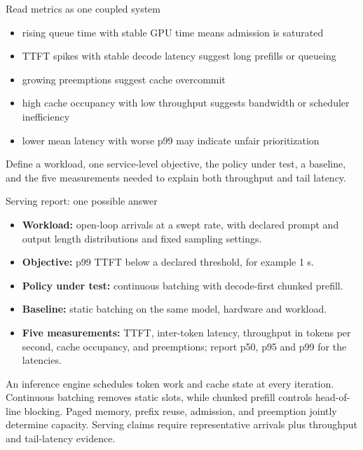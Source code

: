 \documentclass[handout]{beamer}
\begin{document}
\begin{frame}{Read metrics as one coupled system}
  \begin{itemize}
      \setlength{\itemsep}{7pt}
    \item rising queue time with stable GPU time means admission is saturated
    \item TTFT spikes with stable decode latency suggest long prefills or queueing
    \item growing preemptions suggest cache overcommit
    \item high cache occupancy with low throughput suggests bandwidth or scheduler inefficiency
    \item lower mean latency with worse p99 may indicate unfair prioritization
  \end{itemize}
\end{frame}

{Define a workload, one service-level objective, the policy under test, a baseline, and the five measurements needed to explain both throughput and tail latency.}

\begin{frame}{Serving report: one possible answer}
  \begin{itemize}
      \setlength{\itemsep}{8pt}
    \item \textbf{Workload:} open-loop arrivals at a swept rate, with declared prompt and output length distributions and fixed sampling settings.
    \item \textbf{Objective:} p99 TTFT below a declared threshold, for example 1 s.
    \item \textbf{Policy under test:} continuous batching with decode-first chunked prefill.
    \item \textbf{Baseline:} static batching on the same model, hardware and workload.
    \item \textbf{Five measurements:} TTFT, inter-token latency, throughput in tokens per second, cache occupancy, and preemptions; report p50, p95 and p99 for the latencies.
  \end{itemize}
\end{frame}

\takeaways
{An inference engine schedules token work and cache state at every iteration.}
{Continuous batching removes static slots, while chunked prefill controls head-of-line blocking.}
{Paged memory, prefix reuse, admission, and preemption jointly determine capacity.}
{Serving claims require representative arrivals plus throughput and tail-latency evidence.}
\end{document}
